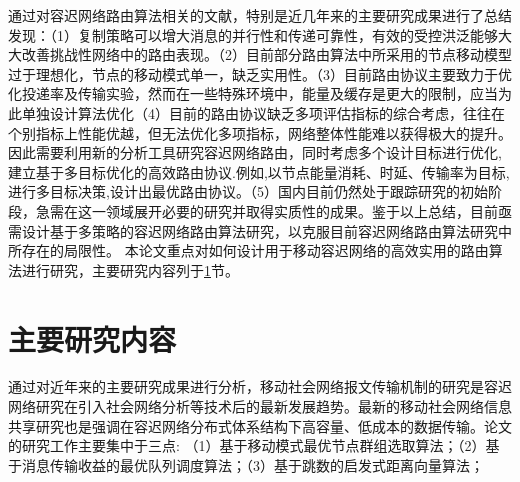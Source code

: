 
通过对容迟网络路由算法相关的文献，特别是近几年来的主要研究成果进行了总结发现：（1）复制策略可以增大消息的并行性和传递可靠性，有效的受控洪泛能够大大改善挑战性网络中的路由表现。（2）目前部分路由算法中所采用的节点移动模型过于理想化，节点的移动模式单一，缺乏实用性。（3）目前路由协议主要致力于优化投递率及传输实验，然而在一些特殊环境中，能量及缓存是更大的限制，应当为此单独设计算法优化（4）目前的路由协议缺乏多项评估指标的综合考虑，往往在个别指标上性能优越，但无法优化多项指标，网络整体性能难以获得极大的提升。因此需要利用新的分析工具研究容迟网络路由，同时考虑多个设计目标进行优化,建立基于多目标优化的高效路由协议.例如,以节点能量消耗、时延、传输率为目标,进行多目标决策,设计出最优路由协议。（5）国内目前仍然处于跟踪研究的初始阶段，急需在这一领域展开必要的研究并取得实质性的成果。鉴于以上总结，目前亟需设计基于多策略的容迟网络路由算法研究，以克服目前容迟网络路由算法研究中所存在的局限性。 本论文重点对如何设计用于移动容迟网络的高效实用的路由算法进行研究，主要研究内容列于\ref{sec:主要研究内容}节。


\section{主要研究内容}
\label{sec:主要研究内容}

通过对近年来的主要研究成果进行分析，移动社会网络报文传输机制的研究是容迟网络研究在引入社会网络分析等技术后的最新发展趋势。最新的移动社会网络信息共享研究也是强调在容迟网络分布式体系结构下高容量、低成本的数据传输。论文的研究工作主要集中于三点: （1）基于移动模式最优节点群组选取算法；（2）基于消息传输收益的最优队列调度算法；（3）基于跳数的启发式距离向量算法；


